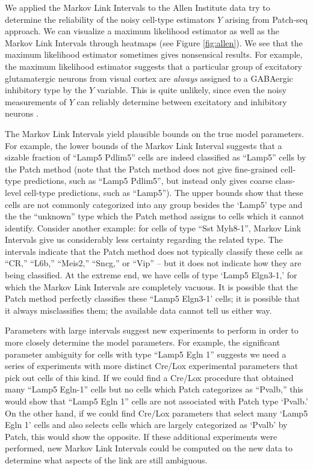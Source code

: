 \documentclass{article}
\theoremstyle{definition}
\begin{document}
We applied the Markov Link Intervals to the Allen Institute data try to determine the reliability of the noisy cell-type estimators $Y$ arising from Patch-seq approach.  We can visualize a maximum likelihood estimator as well as the Markov Link Intervals through heatmaps (see Figure \ref{fig:allen}).  We see that the maximum likelihood estimator sometimes gives nonsensical results.  For example, the maximum likelihood estimator suggests that a particular group of excitatory glutamatergic neurons from visual cortex are \emph{always} assigned to a GABAergic inhibitory type by the $Y$ variable.  This is quite unlikely, since even the noisy measurements of $Y$ can reliably determine between excitatory and inhibitory neurons \cite{cadwell2016electrophysiological,cadwell2017multimodal}. 

The Markov Link Intervals yield plausible bounds on the true model parameters.  For example, the lower bounds of the Markov Link Interval suggests that a sizable fraction of ``Lamp5 Pdlim5'' cells are indeed classified as ``Lamp5'' cells by the Patch method (note that the Patch method does not give fine-grained cell-type predictions, such as ``Lamp5 Pdlim5'', but instead only gives coarse class-level cell-type predictions, such as ``Lamp5'').  The upper bounds show that these cells are not commonly categorized into any group besides the `Lamp5' type and the the ``unknown'' type which the Patch method assigns to cells which it cannot identify.  Consider another example: for cells of type ``Sst Myh8-1'',  Markov Link Intervals give us considerably less certainty regarding the related type.  The intervals indicate that the Patch method does not typically classify these cells as ``CR,'' ``L6b,'' ``Meis2,'' ``Sncg,'' or ``Vip'' -- but it does not indicate how they are being classified.  At the extreme end, we have cells of type `Lamp5 Elgn3-1,' for which the Markov Link Intervals are completely vacuous.   It is possible that the Patch method perfectly classifies these ``Lamp5 Elgn3-1' cells; it is possible that it always misclassifies them; the available data cannot tell us either way.  

Parameters with large intervals suggest new experiments to perform in order to more closely determine the model parameters.  For example, the significant parameter ambiguity for cells with type ``Lamp5 Egln 1'' suggests we need a series of experiments with more distinct Cre/Lox experimental parameters that pick out cells of this kind.  If we could find a Cre/Lox procedure that obtained many ``Lamp5 Egln-1'' cells but no cells which Patch categorizes as ``Pvalb,'' this would show that ``Lamp5 Egln 1'' cells are not associated with Patch type `Pvalb.'  On the other hand, if we could find Cre/Lox parameters that select many `Lamp5 Egln 1' cells and also selects cells which are largely categorized as `Pvalb' by Patch, this would show the opposite.  If these additional experiments were performed, new Markov Link Intervals could be computed on the new data to determine what aspects of the link are still ambiguous.  
\end{document}
